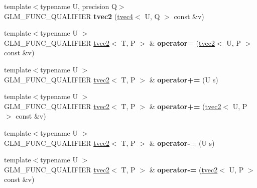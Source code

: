 \begin{DoxyCompactItemize}
\item 
{\footnotesize template$<$typename U, precision Q$>$ }\\G\+L\+M\+\_\+\+F\+U\+N\+C\+\_\+\+Q\+U\+A\+L\+I\+F\+I\+ER {\bfseries tvec2} (\hyperlink{structglm_1_1detail_1_1tvec4}{tvec4}$<$ U, Q $>$ const \&v)\hypertarget{structglm_1_1detail_1_1tvec2_aca6e6031778d2739ec29acfdfc744dc1}{}\label{structglm_1_1detail_1_1tvec2_aca6e6031778d2739ec29acfdfc744dc1}

\item 
{\footnotesize template$<$typename U $>$ }\\G\+L\+M\+\_\+\+F\+U\+N\+C\+\_\+\+Q\+U\+A\+L\+I\+F\+I\+ER \hyperlink{structglm_1_1detail_1_1tvec2}{tvec2}$<$ T, P $>$ \& {\bfseries operator=} (\hyperlink{structglm_1_1detail_1_1tvec2}{tvec2}$<$ U, P $>$ const \&v)\hypertarget{structglm_1_1detail_1_1tvec2_ac89b8aa7379fe8d552c555d6791a8ae1}{}\label{structglm_1_1detail_1_1tvec2_ac89b8aa7379fe8d552c555d6791a8ae1}

\item 
{\footnotesize template$<$typename U $>$ }\\G\+L\+M\+\_\+\+F\+U\+N\+C\+\_\+\+Q\+U\+A\+L\+I\+F\+I\+ER \hyperlink{structglm_1_1detail_1_1tvec2}{tvec2}$<$ T, P $>$ \& {\bfseries operator+=} (U s)\hypertarget{structglm_1_1detail_1_1tvec2_a5e554e1eddaa2b17c7974c117c9123e2}{}\label{structglm_1_1detail_1_1tvec2_a5e554e1eddaa2b17c7974c117c9123e2}

\item 
{\footnotesize template$<$typename U $>$ }\\G\+L\+M\+\_\+\+F\+U\+N\+C\+\_\+\+Q\+U\+A\+L\+I\+F\+I\+ER \hyperlink{structglm_1_1detail_1_1tvec2}{tvec2}$<$ T, P $>$ \& {\bfseries operator+=} (\hyperlink{structglm_1_1detail_1_1tvec2}{tvec2}$<$ U, P $>$ const \&v)\hypertarget{structglm_1_1detail_1_1tvec2_ab3b31e72f4dfa1ad16b84ac277ea83e4}{}\label{structglm_1_1detail_1_1tvec2_ab3b31e72f4dfa1ad16b84ac277ea83e4}

\item 
{\footnotesize template$<$typename U $>$ }\\G\+L\+M\+\_\+\+F\+U\+N\+C\+\_\+\+Q\+U\+A\+L\+I\+F\+I\+ER \hyperlink{structglm_1_1detail_1_1tvec2}{tvec2}$<$ T, P $>$ \& {\bfseries operator-\/=} (U s)\hypertarget{structglm_1_1detail_1_1tvec2_aa1c0434d611d89e971c8f99d332fd634}{}\label{structglm_1_1detail_1_1tvec2_aa1c0434d611d89e971c8f99d332fd634}

\item 
{\footnotesize template$<$typename U $>$ }\\G\+L\+M\+\_\+\+F\+U\+N\+C\+\_\+\+Q\+U\+A\+L\+I\+F\+I\+ER \hyperlink{structglm_1_1detail_1_1tvec2}{tvec2}$<$ T, P $>$ \& {\bfseries operator-\/=} (\hyperlink{structglm_1_1detail_1_1tvec2}{tvec2}$<$ U, P $>$ const \&v)\hypertarget{structglm_1_1detail_1_1tvec2_a08f1294adb7685695d5efa49c7cbe5e7}{}\label{structglm_1_1detail_1_1tvec2_a08f1294adb7685695d5efa49c7cbe5e7}


\end{DoxyCompactItemize}
